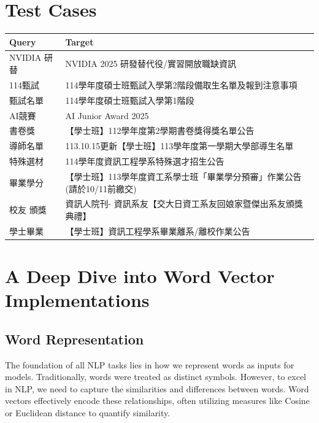 \nocite{*}



\appendix


\section{Test Cases}

\begin{table}[H]
    \begin{tabular}{ll}
    \hline
    \textbf{Query}       & \textbf{Target}                                    \\
    \hline
    NVIDIA 研替 & NVIDIA 2025 研發替代役/實習開放職缺資訊                \\
    114甄試     & 114學年度碩士班甄試入學第2階段備取生名單及報到注意事項             \\
    甄試名單    & 114學年度碩士班甄試入學第1階段                         \\
    AI競賽      & AI Junior Award 2025                      \\
    書卷獎       & 【學士班】112學年度第2學期書卷獎得獎名單公告                  \\
    導師名單      & 113.10.15更新【學士班】113學年度第一學期大學部導生名單         \\
    特殊選材      & 114學年度資訊工程學系特殊選才招生公告                      \\
    畢業學分      & 【學士班】113學年度資工系學士班「畢業學分預審」作業公告(請於10/11前繳交) \\
    校友 頒獎     & 資訊人院刊- 資訊系友【交大日資工系友回娘家暨傑出系友頒獎典禮】          \\
    學士畢業      & 【學士班】資訊工程學系畢業離系/離校作業公告                   \\
    \hline
    \end{tabular}
\end{table}

\section{A Deep Dive into Word Vector Implementations}
\subsection{Word Representation}
The foundation of all NLP tasks lies in how we represent words as inputs for models. Traditionally, words were treated as distinct symbols. However, to excel in NLP, we need to capture the similarities and differences between words. Word vectors effectively encode these relationships, often utilizing measures like Cosine or Euclidean distance to quantify similarity.

